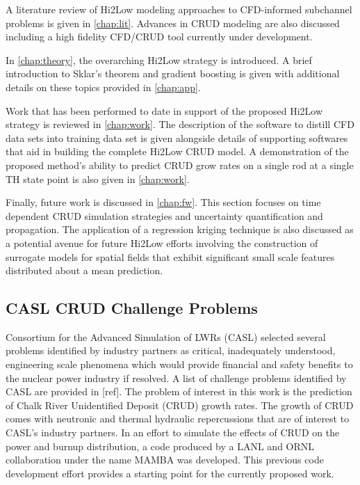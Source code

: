 A literature review of Hi2Low modeling approaches to CFD-informed subchannel
problems is given in \autoref{chap:lit}.  Advances in CRUD modeling are
also discussed including a high fidelity
CFD/CRUD tool currently under development.  

In \autoref{chap:theory}, the overarching Hi2Low strategy is introduced.  A
brief introduction to Sklar's theorem and gradient boosting is given with
additional details on these topics provided in \autoref{chap:app}.

Work that has been performed to date in support of the proposed Hi2Low strategy is reviewed in
\autoref{chap:work}.  The description of the software to distill CFD data sets into
training data set is given alongside details of supporting softwares that aid in building
the complete Hi2Low CRUD model.
A demonstration of the proposed method's ability to predict CRUD grow
rates on a single rod at a single TH state point is also given in
\autoref{chap:work}.

Finally, future work is discussed in \autoref{chap:fw}.  This section
focuses on time dependent CRUD simulation strategies and uncertainty
quantification and propagation.  The application of a regression kriging
technique is also discussed as a potential avenue for future Hi2Low efforts
involving the construction of surrogate models for spatial fields that exhibit
significant small scale features distributed about a mean prediction.

\subsection{CASL CRUD Challenge Problems}

Consortium for the Advanced Simulation of LWRs (CASL) selected several problems identified by industry partners as critical, inadequately understood, engineering scale phenomena which would provide
financial and safety benefits to the nuclear power industry if resolved.  A
list of challenge problems identified by CASL are provided in [ref].  The problem of
interest in this work is the prediction of Chalk River Unidentified Deposit
(CRUD) growth rates.  The growth of CRUD comes with neutronic and thermal
hydraulic repercussions that are of interest to CASL's industry partners.
In an effort to simulate the
effects of CRUD on the power and burnup distribution, a code produced by a LANL
and ORNL collaboration \cite{collins16} under the name MAMBA was developed.
This previous code development effort provides a starting point for the currently proposed work.

